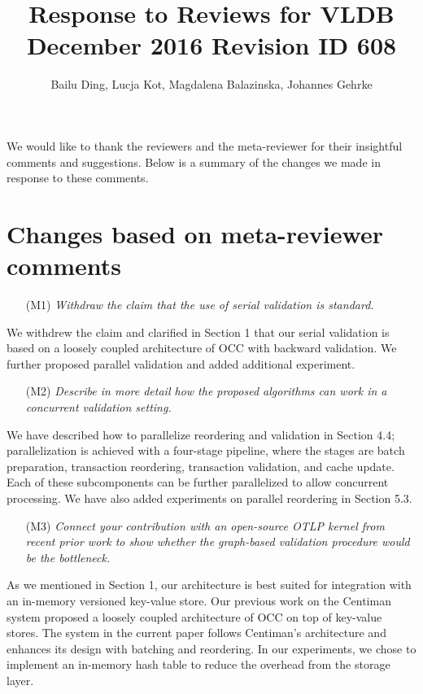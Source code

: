 \documentclass{article}
\begin{document}
\title{Response to Reviews for VLDB December 2016 Revision ID 608}
\author{Bailu Ding, Lucja Kot, Magdalena Balazinska, Johannes Gehrke}
\date{}
\maketitle

We would like to thank the reviewers and the meta-reviewer for their insightful comments and suggestions. Below is a summary of the changes we made in response to these comments.

\section{Changes based on meta-reviewer comments}

\begin{itemize}
\item[(M1)] \emph{Withdraw the claim that the use of serial validation is standard. }
\end{itemize}
\vspace{-1em}
We withdrew the claim and clarified in Section 1 that our serial validation is based on a loosely coupled architecture of OCC with backward validation. We further proposed parallel validation and added additional experiment.
\begin{itemize}
\item[(M2)] \emph{Describe in more detail how the proposed algorithms can work in a concurrent validation setting. }
\end{itemize}
\vspace{-1em}
We have described how to parallelize reordering and validation in Section 4.4; parallelization is achieved with a four-stage pipeline, where the stages are batch preparation, transaction reordering, transaction validation, and cache update. Each of these subcomponents can be further parallelized to allow concurrent processing. We have also added experiments on parallel reordering in Section 5.3. 

\begin{itemize}
\item[(M3)]  \emph{Connect your contribution with an open-source OTLP kernel from recent prior work to show whether the graph-based validation procedure would be the bottleneck.}
\end{itemize}
\vspace{-1em}
As we mentioned in Section 1, our architecture is best suited for integration with an in-memory versioned key-value store. Our previous work on the Centiman system proposed a loosely coupled architecture of OCC on top of key-value stores. The system in the current paper follows Centiman’s architecture and enhances its design with batching and reordering. In our experiments, we chose to implement an in-memory hash table to reduce the overhead from the storage layer.
\end{document}
